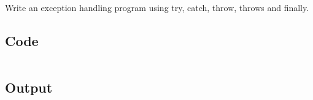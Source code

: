 \documentclass[../main.tex]{subfiles}
\begin{document}
Write an exception handling program using try, catch, throw, throws and
finally.

\subsection{Code}
\inputminted[frame=lines, breaklines, breakanywhere, numberblanklines=false]{java}{./programs/prog10/Errors.java}

\subsection{Output}
\end{document}
